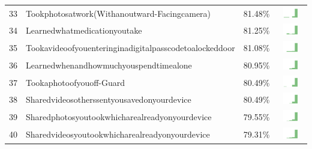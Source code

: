 \documentclass[a4paper,12pt]{article}
\begin{document}
\begin{longtable}{| p{0.5cm} | p{7cm} | p{1cm} | c |}
33 & Tookphotosatwork(Withanoutward-Facingcamera) & 81.48\% & \includegraphics[width = 2cm, height = 0.5cm]{tookphotosatwork(withanoutward-facingcamera)WORKCONTACTS} \\  
34 & Learnedwhatmedicationyoutake & 81.25\% & \includegraphics[width = 2cm, height = 0.5cm]{learnedwhatmedicationyoutakeWORKCONTACTS} \\  
35 & Tookavideoofyouenteringinadigitalpasscodetoalockeddoor & 81.08\% & \includegraphics[width = 2cm, height = 0.5cm]{tookavideoofyouenteringinadigitalpasscodetoalockeddoorWORKCONTACTS} \\  
36 & Learnedwhenandhowmuchyouspendtimealone & 80.95\% & \includegraphics[width = 2cm, height = 0.5cm]{learnedwhenandhowmuchyouspendtimealoneWORKCONTACTS} \\  
37 & Tookaphotoofyouoff-Guard & 80.49\% & \includegraphics[width = 2cm, height = 0.5cm]{tookaphotoofyouoff-guardWORKCONTACTS} \\  
38 & Sharedvideosotherssentyousavedonyourdevice & 80.49\% & \includegraphics[width = 2cm, height = 0.5cm]{sharedvideosotherssentyousavedonyourdeviceWORKCONTACTS} \\  
39 & Sharedphotosyoutookwhicharealreadyonyourdevice & 79.55\% & \includegraphics[width = 2cm, height = 0.5cm]{sharedphotosyoutookwhicharealreadyonyourdeviceWORKCONTACTS} \\  
40 & Sharedvideosyoutookwhicharealreadyonyourdevice & 79.31\% & \includegraphics[width = 2cm, height = 0.5cm]{sharedvideosyoutookwhicharealreadyonyourdeviceWORKCONTACTS} \\  

\end{longtable}
\end{document}
